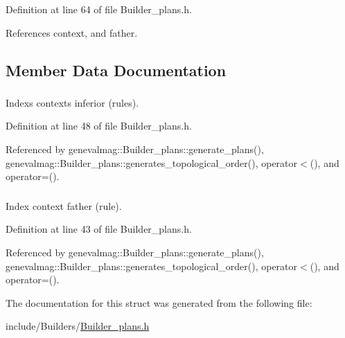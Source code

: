 Definition at line 64 of file Builder\_\-plans.h.



References context, and father.



\subsection{Member Data Documentation}
\hypertarget{structgenevalmag_1_1c__rule_af0b0004a1f307e5cb18ed26d3e983f1d}{
\subsubsection[{context}]{}}
\label{structgenevalmag_1_1c__rule_af0b0004a1f307e5cb18ed26d3e983f1d}


Indexs contexts inferior (rules). 



Definition at line 48 of file Builder\_\-plans.h.



Referenced by genevalmag::Builder\_\-plans::generate\_\-plans(), genevalmag::Builder\_\-plans::generates\_\-topological\_\-order(), operator$<$(), and operator=().

\hypertarget{structgenevalmag_1_1c__rule_abe7fed1600af3652ab298ac2a897b18f}{
\subsubsection[{father}]{}}
\label{structgenevalmag_1_1c__rule_abe7fed1600af3652ab298ac2a897b18f}


Index context father (rule). 



Definition at line 43 of file Builder\_\-plans.h.



Referenced by genevalmag::Builder\_\-plans::generate\_\-plans(), genevalmag::Builder\_\-plans::generates\_\-topological\_\-order(), operator$<$(), and operator=().



The documentation for this struct was generated from the following file:\begin{DoxyCompactItemize}
\item 
include/Builders/\hyperlink{Builder__plans_8h}{Builder\_\-plans.h}\end{DoxyCompactItemize}
